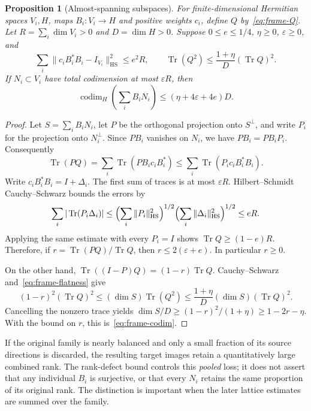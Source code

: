\documentclass[11pt,openany,oneside]{scrbook}
\newtheorem{proposition}[theorem]{Proposition}
\theoremstyle{definition}
\theoremstyle{remark}
\begin{document}
\begin{proposition}[Almost-spanning subspaces]\label{prop:frame-cover}
For finite-dimensional Hermitian spaces $V_i,H$, maps $B_i:V_i\to H$ and positive weights $c_i$, define $Q$ by~\eqref{eq:frame-Q}.  Let $R=\sum_i\dim V_i>0$ and $D=\dim H>0$.  Suppose $0\le e\le1/4$, $\eta\ge0$, $\varepsilon\ge0$, and
\begin{equation}\label{eq:frame-assumptions}
\sum_i\|c_iB_i^*B_i-I_{V_i}\|_{\mathrm{HS}}^2\le e^2R,
\qquad
\operatorname{Tr}(Q^2)\le\frac{1+\eta}{D}(\operatorname{Tr}Q)^2.
\end{equation}
If $N_i\subset V_i$ have total codimension at most $\varepsilon R$, then
\begin{equation}\label{eq:frame-codim}
\operatorname{codim}_H\left(\sum_iB_iN_i\right)
\le(\eta+4\varepsilon+4e)D.
\end{equation}
\end{proposition}
\begin{proof}
Let $S=\sum_i B_iN_i$, let $P$ be the orthogonal projection onto $S^\perp$, and write $P_i$ for the projection onto $N_i^\perp$.  Since $PB_i$ vanishes on $N_i$, we have $PB_i=PB_iP_i$.  Consequently
\[
\operatorname{Tr}(PQ)
=\sum_i\operatorname{Tr}(PB_ic_iB_i^*)
\le\sum_i\operatorname{Tr}(P_ic_iB_i^*B_i).
\]
Write $c_iB_i^*B_i=I+\Delta_i$.  The first sum of traces is at most $\varepsilon R$.  Hilbert--Schmidt Cauchy--Schwarz bounds the errors by
\[
\sum_i |\operatorname{Tr}(P_i\Delta_i)|
\le\Bigl(\sum_i\|P_i\|_{\mathrm{HS}}^2\Bigr)^{1/2}
\Bigl(\sum_i\|\Delta_i\|_{\mathrm{HS}}^2\Bigr)^{1/2}\le eR.
\]
Applying the same estimate with every $P_i=I$ shows $\operatorname{Tr}Q\ge(1-e)R$.  Therefore, if $r=\operatorname{Tr}(PQ)/\operatorname{Tr}Q$, then $r\le 2(\varepsilon+e)$.  In particular $r\ge0$.

On the other hand, $\operatorname{Tr}((I-P)Q)=(1-r)\operatorname{Tr}Q$.  Cauchy--Schwarz and~\eqref{eq:frame-flatness} give
\[
(1-r)^2(\operatorname{Tr}Q)^2
\le(\dim S)\operatorname{Tr}(Q^2)
\le\frac{1+\eta}{D}(\dim S)(\operatorname{Tr}Q)^2.
\]
Cancelling the nonzero trace yields $\dim S/D\ge(1-r)^2/(1+\eta)\ge1-2r-\eta$.  With the bound on $r$, this is~\eqref{eq:frame-codim}.
\end{proof}

If the original family is nearly balanced and only a small fraction of its source directions is discarded, the resulting target images retain a quantitatively large combined rank. The rank-defect bound controls this \emph{pooled} loss; it does not assert that any individual $B_i$ is surjective, or that every $N_i$ retains the same proportion of its original rank. The distinction is important when the later lattice estimates are summed over the family.
\end{document}
